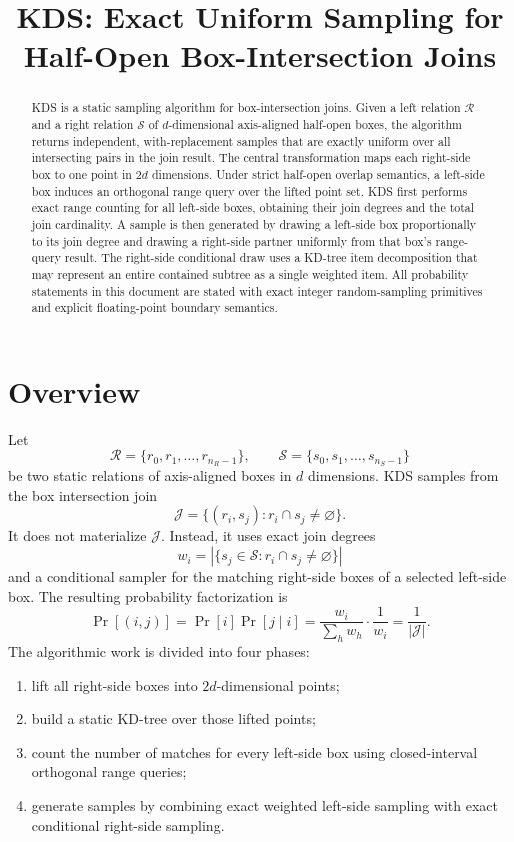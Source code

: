 \documentclass[11pt]{article}
\title{KDS: Exact Uniform Sampling for Half-Open Box-Intersection Joins}
\author{}
\date{}
\theoremstyle{definition}
\theoremstyle{plain}
\theoremstyle{remark}
\newcommand{\Rrel}{\mathcal R}
\newcommand{\Srel}{\mathcal S}
\newcommand{\Jset}{\mathcal J}
\begin{document}
\maketitle

\begin{abstract}
KDS is a static sampling algorithm for box-intersection joins.  Given a left relation
$\Rrel$ and a right relation $\Srel$ of $d$-dimensional axis-aligned half-open boxes,
the algorithm returns independent, with-replacement samples that are exactly uniform over
all intersecting pairs in the join result.  The central transformation maps each right-side
box to one point in $2d$ dimensions.  Under strict half-open overlap semantics, a left-side
box induces an orthogonal range query over the lifted point set.  KDS first performs exact
range counting for all left-side boxes, obtaining their join degrees and the total join
cardinality.  A sample is then generated by drawing a left-side box proportionally to its
join degree and drawing a right-side partner uniformly from that box's range-query result.
The right-side conditional draw uses a KD-tree item decomposition that may represent an
entire contained subtree as a single weighted item.  All probability statements in this
document are stated with exact integer random-sampling primitives and explicit floating-point
boundary semantics.
\end{abstract}

\section{Overview}

Let
\[
  \Rrel = \{r_0,r_1,\ldots,r_{n_R-1}\},
  \qquad
  \Srel = \{s_0,s_1,\ldots,s_{n_S-1}\}
\]
be two static relations of axis-aligned boxes in $d$ dimensions.  KDS samples from the box
intersection join
\[
  \Jset = \{(r_i,s_j) : r_i\cap s_j\neq\varnothing\}.
\]
It does not materialize $\Jset$.  Instead, it uses exact join degrees
\[
  w_i = |\{s_j\in\Srel : r_i\cap s_j\neq\varnothing\}|
\]
and a conditional sampler for the matching right-side boxes of a selected left-side box.
The resulting probability factorization is
\[
  \Pr[(i,j)]
  = \Pr[i]\Pr[j\mid i]
  = \frac{w_i}{\sum_h w_h}\cdot \frac{1}{w_i}
  = \frac{1}{|\Jset|}.
\]
The algorithmic work is divided into four phases:
\begin{enumerate}[leftmargin=2em]
  \item lift all right-side boxes into $2d$-dimensional points;
  \item build a static KD-tree over those lifted points;
  \item count the number of matches for every left-side box using closed-interval orthogonal
        range queries;
  \item generate samples by combining exact weighted left-side sampling with exact conditional
        right-side sampling.
\end{enumerate}
\end{document}
